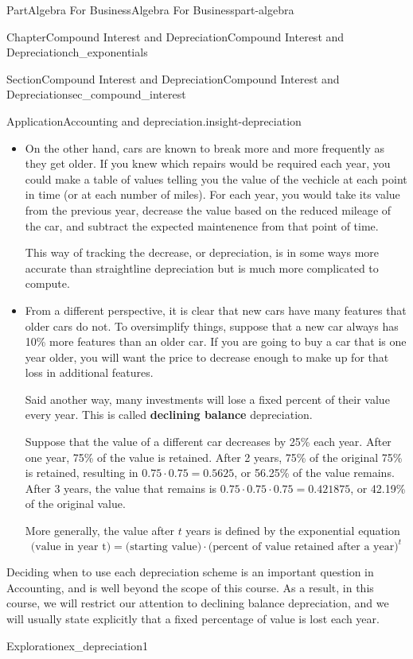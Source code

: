 \documentclass[oneside,10pt,]{tufte-book}
\newcommand{\terminology}[1]{\textbf{#1}}
\numberwithin{equation}{chapter}
\begin{document}
\begin{partptx}{Part}{Algebra For Business}{}{Algebra For Business}{}{}{part-algebra}
\begin{chapterptx}{Chapter}{Compound Interest and Depreciation}{}{Compound Interest and Depreciation}{}{}{ch_exponentials}
\begin{sectionptx}{Section}{Compound Interest and Depreciation}{}{Compound Interest and Depreciation}{}{}{sec_compound_interest}
\begin{insight}{Application}{Accounting and depreciation.}{insight-depreciation}
\begin{itemize}[label=\textbullet]
%
\item{}On the other hand, cars are known to break more and more frequently as they get older.  If you knew which repairs would be required each year, you could make a table of values telling you the value of the vechicle at each point in time (or at each number of miles).  For each year, you would take its value from the previous year, decrease the value based on the reduced mileage of the car, and subtract the expected maintenence from that point of time.%
\par
This way of tracking the decrease, or depreciation, is in some ways more accurate than straightline depreciation but is much more complicated to compute.%
\item{}From a different perspective, it is clear that new cars have many features that older cars do not.  To oversimplify things, suppose  that a new car always has 10\% more features than an older car.  If you are going to buy a car that is one year older, you will want the price to decrease enough to make up for that loss in additional features.%
\par
Said another way, many investments will lose a fixed percent of their value every year.  This is called \terminology{declining balance} depreciation.%
\par
Suppose that the value of a different car decreases by 25\% each year.  After one year, 75\% of the value is retained.  After 2 years, 75\% of the original 75\% is retained, resulting in \(0.75\cdot 0.75= 0.5625\), or 56.25\% of the value remains.  After 3 years, the value that remains is  \(0.75\cdot 0.75\cdot 0.75= 0.421875\), or 42.19\% of the original value.%
\par
More generally, the value after \(t\) years is defined by the exponential equation%
\begin{equation*}
\text{(value in year t)} = \text{(starting value)}\cdot \text{(percent of value retained after a year)}^t
\end{equation*}
%
\end{itemize}
%
\par
Deciding when to use each depreciation scheme is an important question in Accounting, and is well beyond the scope of this course. As a result, in this course, we will restrict our attention to declining balance depreciation, and we will usually state explicitly that a fixed percentage of value is lost each year.%
\end{insight}
\begin{exploration}{Exploration}{}{ex_depreciation1}%

\end{exploration}
\end{sectionptx}
\end{chapterptx}
\end{partptx}
\end{document}
